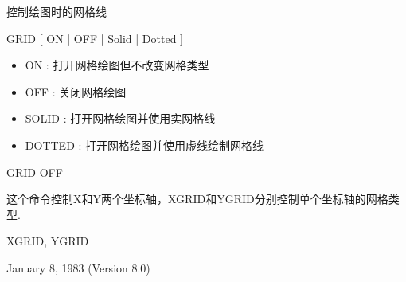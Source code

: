 \label{cmd:grid}

控制绘图时的网格线

GRID [ ON | OFF | Solid | Dotted ]

\begin{itemize}
\item ON : 打开网格绘图但不改变网格类型
\item OFF : 关闭网格绘图 
\item SOLID : 打开网格绘图并使用实网格线 
\item DOTTED : 打开网格绘图并使用虚线绘制网格线 
\end{itemize}

GRID OFF

这个命令控制X和Y两个坐标轴，XGRID和YGRID分别控制单个坐标轴的网格类型.

XGRID, YGRID

January 8, 1983 (Version 8.0)
